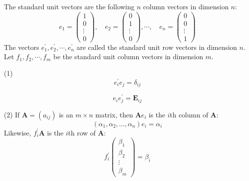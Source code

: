 \documentclass[12pt, a4paper, oneside]{book}
\begin{document}
\begin{theorem}
    The standard unit vectors are the following $n$ column vectors in dimension $n$:
    \[
        {e}_1=\left(\begin{array}{c}
                1      \\
                0      \\
                \vdots \\
                0
            \end{array}\right), \quad {e}_2=\left(\begin{array}{c}
                0      \\
                1      \\
                \vdots \\
                0
            \end{array}\right), \cdots, \quad {e}_n=\left(\begin{array}{c}
                0      \\
                0      \\
                \vdots \\
                1
            \end{array}\right)
    \]
    The vectors ${e}_1^{\prime}, {e}_2^{\prime}, \cdots, {e}_n^{\prime}$ are called the standard unit row vectors in dimension $n$. Let $f_1, f_2, \cdots, f_m$ be the standard unit column vectors in dimension $m$.

    (1)
    \[
        {e}_i^{\prime} {e}_j
        =
        \delta_{ij}
    \]

    \[
        {e}_i{e}_j^{\prime}
        =
        \mathbf{E}_{i j}
    \]


    (2) If $\mathbf{A}=\left(a_{i j}\right)$ is an $m \times n$ matrix, then $\mathbf{A} {e}_i$ is the $i$th column of $\mathbf{A}$:
    \[
        \left({\alpha_1},{\alpha_2},\ldots,{\alpha_n}\right) {e}_i
        =
        {\alpha}_i
    \]
    Likewise, ${f}_i^{\prime} \mathbf{A}$ is the $i$th row of $\mathbf{A}$:
    \[
        {f}_i^\prime
        \left(
        \begin{matrix}
                {\beta}_1 \\
                {\beta}_2 \\
                \vdots    \\
                {\beta}_m
            \end{matrix}
        \right)
        =
        {\beta}_i
    \]


\end{theorem}
\end{document}
